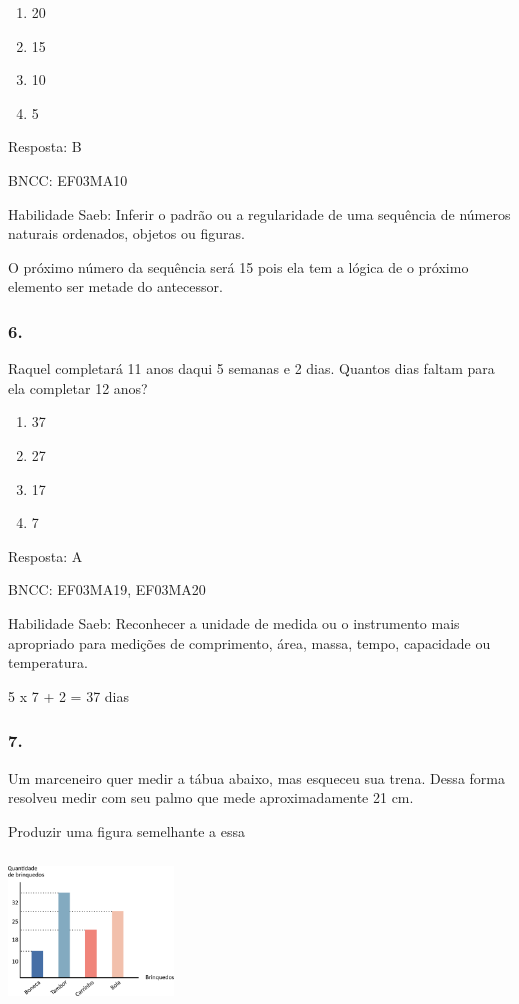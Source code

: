 \begin{enumerate}
\def\labelenumi{\alph{enumi})}
\item
  20
\item
  15
\item
  10
\item
  5
\end{enumerate}

Resposta: B

BNCC: EF03MA10

Habilidade Saeb: Inferir o padrão ou a regularidade de uma sequência de
números naturais ordenados, objetos ou figuras.

O próximo número da sequência será 15 pois ela tem a lógica de o próximo
elemento ser metade do antecessor.

\subsubsection{6.}\label{section-146}

Raquel completará 11 anos daqui 5 semanas e 2 dias. Quantos dias faltam
para ela completar 12 anos?

\begin{enumerate}
\def\labelenumi{\alph{enumi})}
\item
  37
\item
  27
\item
  17
\item
  7
\end{enumerate}

Resposta: A

BNCC: EF03MA19, EF03MA20

Habilidade Saeb: Reconhecer a unidade de medida ou o instrumento mais
apropriado para medições de comprimento, área, massa, tempo, capacidade
ou temperatura.

5 x 7 + 2 = 37 dias

\subsubsection{7.}\label{section-147}

Um marceneiro quer medir a tábua abaixo, mas esqueceu sua trena. Dessa
forma resolveu medir com seu palmo que mede aproximadamente 21 cm.

Produzir uma figura semelhante a essa

\includegraphics[width=1.73077in,height=1.57654in]{media/image119.png}

